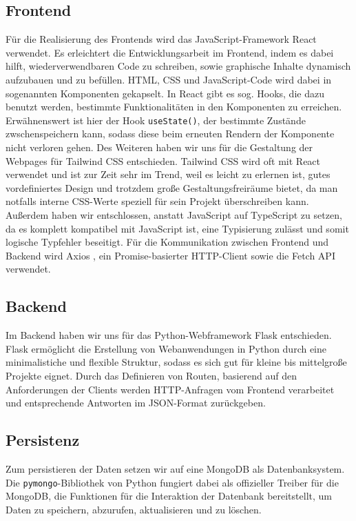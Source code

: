 \documentclass[conference,a4paper,flushend]{cs-techrep}
\begin{document}
\subsection{Frontend}
Für die Realisierung des Frontends wird das JavaScript-Framework React \cite{react} verwendet. Es erleichtert die Entwicklungsarbeit im Frontend, indem es dabei hilft, wiederverwendbaren Code zu schreiben, sowie graphische Inhalte dynamisch aufzubauen und zu befüllen. HTML, CSS und JavaScript-Code wird dabei in sogenannten Komponenten gekapselt. In React gibt es sog. Hooks, die dazu benutzt werden, bestimmte Funktionalitäten in den Komponenten zu erreichen. Erwähnenswert ist hier der Hook \texttt{useState()}, der bestimmte Zustände zwschenspeichern kann, sodass diese beim erneuten Rendern der Komponente nicht verloren gehen. Des Weiteren haben wir uns für die Gestaltung der Webpages für Tailwind CSS \cite{noauthor_tailwind_nodate} entschieden. Tailwind CSS wird oft mit React \cite{react} verwendet und ist zur Zeit sehr im Trend, weil es leicht zu erlernen ist, gutes vordefiniertes Design und trotzdem große Gestaltungsfreiräume bietet, da man notfalls interne CSS-Werte speziell für sein Projekt überschreiben kann. Außerdem haben wir entschlossen, anstatt JavaScript \cite{noauthor_ecma-262_nodate} auf TypeScript \cite{typescript} zu setzen, da es komplett kompatibel mit JavaScript ist, eine Typisierung zulässt und somit logische Typfehler beseitigt. Für die Kommunikation zwischen Frontend und Backend wird Axios \cite{noauthor_axios_nodate}, ein Promise-basierter HTTP-Client sowie die Fetch API \cite{noauthor_fetch_nodate} verwendet.


\subsection{Backend}
Im Backend haben wir uns für das Python-Webframework Flask \cite{flask} entschieden. Flask ermöglicht die Erstellung von Webanwendungen in Python durch eine minimalistiche und flexible Struktur, sodass es sich gut für kleine bis mittelgroße Projekte eignet. Durch das Definieren von Routen, basierend auf den Anforderungen der Clients werden HTTP-Anfragen vom Frontend verarbeitet und entsprechende Antworten im JSON-Format \cite{noauthor_json_nodate} zurückgeben.


\subsection{Persistenz}
Zum persistieren der Daten setzen wir auf eine MongoDB \cite{mongodb} als Datenbanksystem. Die \texttt{pymongo}-Bibliothek \cite{pymongo} von Python fungiert dabei als offizieller Treiber für die MongoDB, die Funktionen für die Interaktion der Datenbank bereitstellt, um Daten zu speichern, abzurufen, aktualisieren und zu löschen.
\end{document}
